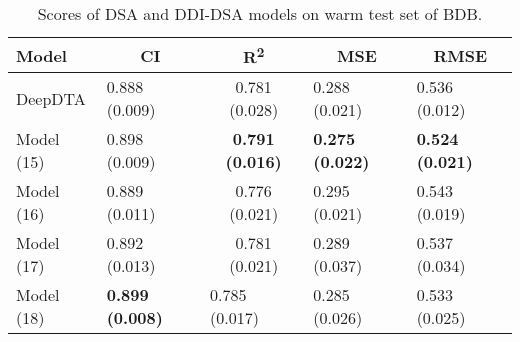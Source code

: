 \begin{table}
\centering
\caption{Scores of DSA and DDI-DSA models on warm test set of BDB.}
\vspace{0.25em}
\begin{tabular}{|l|l|c|l|l|} 
\hline
Model & \multicolumn{1}{c|}{CI} & R\textsuperscript{2} & \multicolumn{1}{c|}{MSE} & \multicolumn{1}{c|}{RMSE} \\ 
\hline
DeepDTA & 0.888 (0.009) & 0.781 (0.028) & 0.288 (0.021) & 0.536 (0.012) \\ 
\hline
Model (15) & 0.898 (0.009) & \textbf{0.791 (0.016)} & \textbf{0.275 (0.022)} & \textbf{0.524 (0.021)} \\ 
\hline
Model (16) & 0.889 (0.011) & 0.776 (0.021) & 0.295 (0.021) & 0.543 (0.019) \\ 
\hline
Model (17) & 0.892 (0.013) & 0.781 (0.021) & 0.289 (0.037) & 0.537 (0.034) \\ 
\hline
Model (18) & \textbf{0.899 (0.008)} & \multicolumn{1}{l|}{0.785 (0.017)} & 0.285 (0.026) & 0.533 (0.025) \\
\hline
\end{tabular}
\label{tab:side_warm}
\end{table}